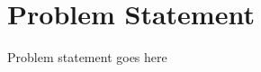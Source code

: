 
\section{Problem Statement}
\label{sec:ProblemStatement}

\large{\raggedright
Problem statement goes here\\
}
